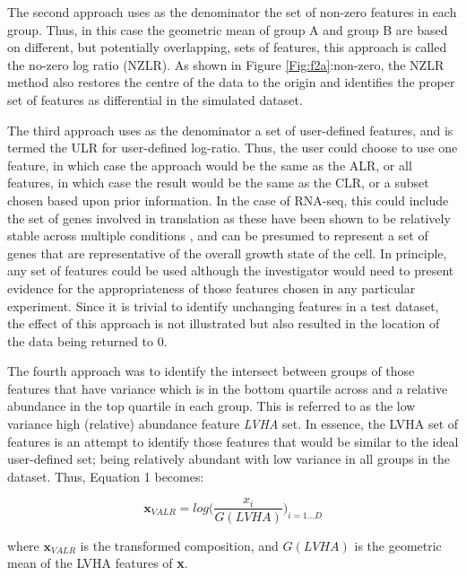 \documentclass{bmcart}
\begin{document}
The second approach uses as the denominator the set of non-zero features in each group.  Thus, in this case the geometric mean of group A and group B are based on different, but potentially overlapping, sets of features, this approach is called the no-zero log ratio (NZLR). As shown in Figure \ref{Fig:f2a}:non-zero, the NZLR method also restores the centre of the data to the origin and identifies the proper set of features as differential in the simulated dataset. 



The  third  approach uses as the denominator a set of user-defined features, and is termed the ULR for user-defined log-ratio. Thus, the user could choose to use one feature, in which case the approach would be the same as the ALR, or all features, in which case the result would be the same as the CLR, or a subset chosen based upon prior information. In the case of RNA-seq, this could include the set of genes involved in translation as these have been shown to be relatively stable across multiple conditions \cite{Scott:2010}, and can be presumed to represent a set of genes that are representative of the overall growth state of the cell. In principle, any set of features could be used although the investigator would need to present evidence for the  appropriateness of those features chosen in any particular experiment. Since it is trivial to identify unchanging features in a test dataset, the effect of this approach is not illustrated but also resulted in the location of the data being returned to 0. 

The fourth approach was to identify the intersect between groups of those features that have variance which is in the bottom quartile across and a relative abundance in the top quartile in each group. This is referred to as the low variance high (relative) abundance feature \textit{LVHA} set. In essence, the LVHA set of features is an attempt to identify those features that would be similar to the ideal user-defined set; being relatively abundant with low variance in all groups in the dataset. Thus, Equation 1 becomes:

\begin{equation}
\textbf{x}_{\mathit{VALR}} = log  \big( \frac{x_i}{G(\mathit{LVHA})}   \big)_{i=1 \dots D}
\label{eq:lvha}
\end{equation}

where $\textbf{x}_{\mathit{VALR}}$ is the transformed composition, and 	$G(\mathit{LVHA})$ is the geometric mean of the LVHA features of \textbf{x}. 
 
\end{document}
